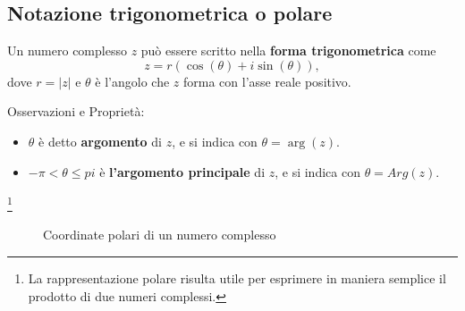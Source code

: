 \documentclass{book}
\begin{document}
\subsection{Notazione trigonometrica o polare}
\begin{definition}
    Un numero complesso \( z \) può essere scritto nella \textbf{forma trigonometrica} come
    \[ z = r(\cos(\theta) + i \sin(\theta)), \]
    dove \( r = |z| \) e \( \theta \) è l'angolo che \( z \) forma con l'asse reale positivo.

    \noindent Osservazioni e Proprietà:
    \begin{itemize}
        \item \(\theta\) è detto \textbf{argomento} di \(z\), e si indica con \(\theta = \arg(z)\). \\
        \item \(-\pi < \theta \leq pi \) è \textbf{l'argomento principale} di \(z\), e si indica con \(\theta = Arg(z)\).
    \end{itemize}
    \footnote{La rappresentazione polare risulta utile per esprimere in maniera semplice il prodotto di due numeri complessi.}
\end{definition}
\begin{figure}[H]
    \centering
    \caption{Coordinate polari di un numero complesso}
    \label{fig:polari}
\end{figure}
\end{document}

